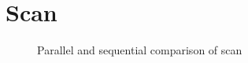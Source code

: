 \section{Scan}
\label{sec:scan}

\begin{figure}[htb]
  \centering
  
  \caption{Parallel and sequential comparison of scan}
  \label{fig:par seq scan}
\end{figure}

